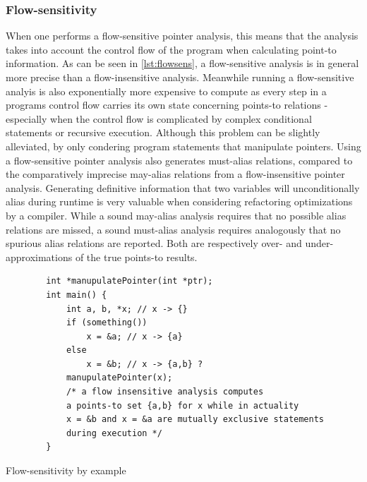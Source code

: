 \subsubsection{Flow-sensitivity}
When one performs a flow-sensitive pointer analysis, this means that the analysis takes into account the control flow of the program when calculating point-to information.
As can be seen in \ref{lst:flowsens}, a flow-sensitive analysis is in general more precise than a flow-insensitive analysis. Meanwhile running a flow-sensitive analyis is also exponentially more expensive to compute as every step in a programs control flow carries its own state concerning points-to relations - especially when the control flow is complicated by complex conditional statements or recursive execution.
Although this problem can be slightly alleviated, by only condering program statements that manipulate pointers.
Using a flow-sensitive pointer analysis also generates must-alias relations, compared to the comparatively imprecise may-alias relations from a flow-insensitive pointer analysis.
Generating definitive information that two variables will unconditionally alias during runtime is very valuable when considering refactoring optimizations by a compiler.
While a sound may-alias analysis requires that no possible alias relations are missed, a sound must-alias analysis requires analogously that no spurious alias relations are reported. Both are respectively over- and under-approximations of the true points-to results.

\begin{listing}
    \begin{verbatim}
        int *manupulatePointer(int *ptr);
        int main() {
            int a, b, *x; // x -> {}
            if (something())
                x = &a; // x -> {a}
            else
                x = &b; // x -> {a,b} ?
            manupulatePointer(x);
            /* a flow insensitive analysis computes 
            a points-to set {a,b} for x while in actuality 
            x = &b and x = &a are mutually exclusive statements
            during execution */
        }
    \end{verbatim}
    \caption{Flow-sensitivity by example}
    \label{lst:flowsens}
\end{listing}

